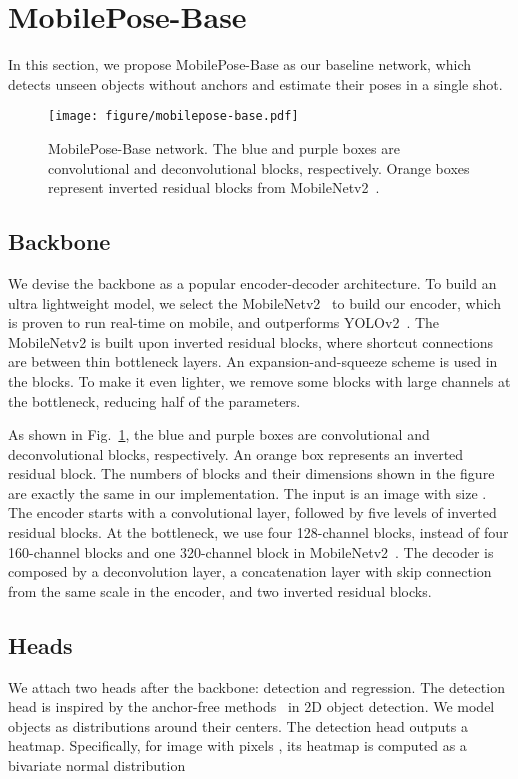 \documentclass[runningheads]{llncs}
\begin{document}
\section{MobilePose-Base}
In this section, we propose MobilePose-Base as our baseline network, which detects unseen objects without anchors and estimate their poses in a single shot.

\begin{figure}[t]
    \centering
    \texttt{[image: figure/mobilepose-base.pdf]}
    \caption{MobilePose-Base network. The blue and purple boxes are convolutional and deconvolutional blocks, respectively. Orange boxes represent inverted residual blocks from MobileNetv2~\cite{Sandler_2018_MobileNetv2}.}
    \label{fig:base}
\end{figure}

\subsection{Backbone}
We devise the backbone as a popular encoder-decoder architecture. To build an ultra lightweight model, we select the MobileNetv2~\cite{Sandler_2018_MobileNetv2} to build our encoder, which is proven to run real-time on mobile, and outperforms YOLOv2~\cite{Redmon_2016_YOLOv2}. The MobileNetv2 is built upon inverted residual blocks, where shortcut connections are between thin bottleneck layers. An expansion-and-squeeze scheme is used in the blocks. To make it even lighter, we remove some blocks with large channels at the bottleneck, reducing half of the parameters.

As shown in Fig.~\ref{fig:base}, the blue and purple boxes are convolutional and deconvolutional blocks, respectively. An orange box represents an inverted residual block. The numbers of blocks and their dimensions shown in the figure are exactly the same in our implementation. The input is an image with size . The encoder starts with a convolutional layer, followed by five levels of inverted residual blocks. At the bottleneck, we use four 128-channel blocks, instead of four 160-channel blocks and one 320-channel block in MobileNetv2~\cite{Sandler_2018_MobileNetv2}. The decoder is composed by a deconvolution layer, a concatenation layer with skip connection from the same scale in the encoder, and two inverted residual blocks.

\subsection{Heads}\label{sec:head}
We attach two heads after the backbone: detection and regression. The detection head is inspired by the anchor-free methods~\cite{Law_2018_CornerNet,Zhou_2019_CenterNet} in 2D object detection. We model objects as distributions around their centers. The detection head outputs a  heatmap. Specifically, for image  with pixels , its heatmap is computed as a bivariate normal distribution~\cite{Ding_2019_Distribution} 
\end{document}
